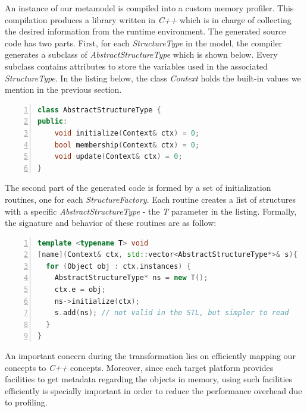 An instance of our metamodel is compiled into a custom memory profiler.
This compilation produces a library written in \textit{C++} which is in charge of collecting the desired information from the runtime environment.
The generated source code has two parts.
First, for each \textit{StructureType} in the model, the compiler generates a subclass of \textit{AbstractStructureType} which is shown below.
Every subclass contains attributes to store the variables used in the associated \textit{StructureType}.
In the listing below, the class \textit{Context} holds the built-in values we mention in the previous section.
\begin{lstlisting}[language=C++, frame=L,
numbers=left,
numberstyle=\color{black}\scriptsize,xleftmargin=2\parindent]
class AbstractStructureType {
public:
	void initialize(Context& ctx) = 0;
	bool membership(Context& ctx) = 0;
	void update(Context& ctx) = 0;
}
\end{lstlisting}

The second part of the generated code is formed by a set of initialization routines, one for each \textit{StructureFactory}.
Each routine creates a list of structures with a specific \textit{AbstractStructureType} - the \textit{T} parameter in the listing.
Formally, the signature and behavior of these routines are as follow:
\begin{lstlisting}[language=C++, frame=L,
numbers=left,
numberstyle=\color{black}\scriptsize,xleftmargin=2\parindent]
template <typename T> void
[name](Context& ctx, std::vector<AbstractStructureType*>& s){
  for (Object obj : ctx.instances) {
    AbstractStructureType* ns = new T();
    ctx.e = obj;
    ns->initialize(ctx);
    s.add(ns); // not valid in the STL, but simpler to read
  }
}
\end{lstlisting}
An important concern during the transformation lies on efficiently mapping our concepts to \textit{C++} concepts.
Moreover, since each target platform provides facilities to get metadata regarding the objects in memory, using such facilities efficiently is specially important in order to reduce the performance overhead due to profiling.


